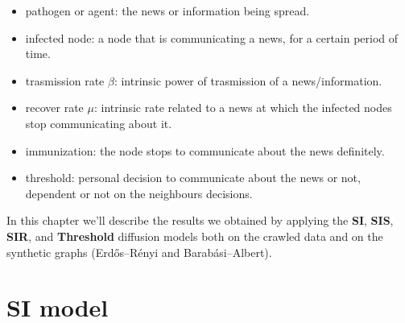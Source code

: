 \begin{itemize}
\item pathogen or agent: the news or information being spread.
\item infected node: a node that is communicating a news, for a certain period of time.
\item trasmission rate $\beta$: intrinsic power of trasmission of a news/information.
\item recover rate $\mu$: intrinsic rate related to a news at which the infected nodes stop communicating about it.
\item immunization: the node stops to communicate about the news definitely.
\item threshold: personal decision to communicate about the news or not, dependent or not on the neighbours decisions.
\end{itemize}


In this chapter we'll describe the results we obtained by applying the \textbf{SI}, \textbf{SIS}, \textbf{SIR},
and \textbf{Threshold} diffusion models both on the crawled data and on the synthetic graphs (Erdős–Rényi and
Barabási–Albert).

\section{SI model} %
\label{sec:si_model}


